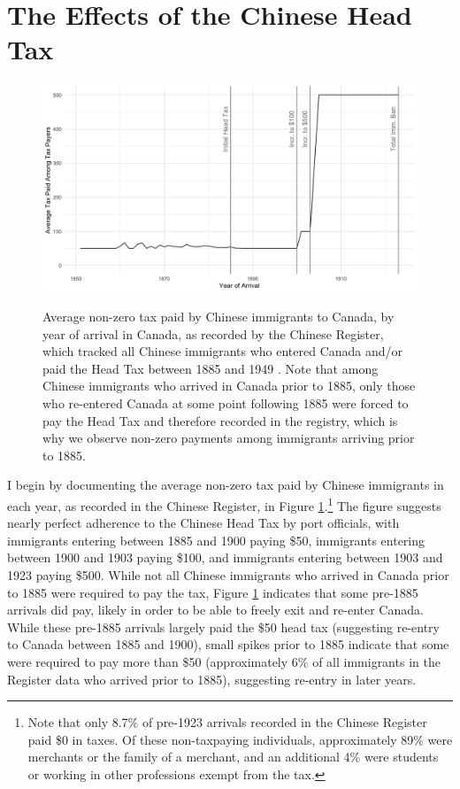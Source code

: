 \documentclass[12pt]{article}
\begin{document}
\section{The Effects of the Chinese Head Tax}

\begin{figure}
    \centering 
    \caption{Average non-zero tax paid by Chinese immigrants to Canada, by year of arrival in Canada, as recorded by the Chinese Register, which tracked all Chinese immigrants who entered Canada and/or paid the Head Tax between 1885 and 1949 \citep{chineseregister}. Note that among Chinese immigrants who arrived in Canada prior to 1885, only those who re-entered Canada at some point following 1885 were forced to pay the Head Tax and therefore recorded in the registry, which is why we observe non-zero payments among immigrants arriving prior to 1885.}
    \includegraphics[width=\textwidth]{../../figs/fig1_taxespaid.png}
    \label{fig:taxpaid}
\end{figure}

I begin by documenting the average non-zero tax paid by Chinese immigrants in each year, as recorded in the Chinese Register, in Figure \ref{fig:taxpaid}.\footnote{Note that only 8.7\% of pre-1923 arrivals recorded in the Chinese Register paid \$0 in taxes. 
Of these non-taxpaying individuals, approximately 89\% were merchants or the family of a merchant, and an additional 4\% were students or working in other professions exempt from the tax.} The figure suggests nearly perfect adherence to the Chinese Head Tax by port officials, with immigrants entering between 1885 and 1900 paying \$50, immigrants entering between 1900 and 1903 paying \$100, and immigrants entering between 1903 and 1923 paying \$500. 
While not all Chinese immigrants who arrived in Canada prior to 1885 were required to pay the tax, Figure \ref{fig:taxpaid} indicates that some pre-1885 arrivals did pay, likely in order to be able to freely exit and re-enter Canada. While these pre-1885 arrivals largely paid the \$50 head tax (suggesting re-entry to Canada between 1885 and 1900), small spikes prior to 1885 indicate that some were required to pay more than \$50 (approximately 6\% of all immigrants in the Register data who arrived prior to 1885), suggesting re-entry in later years. 
\end{document}
